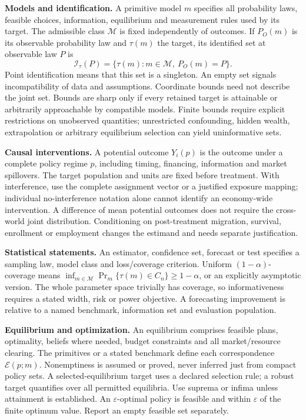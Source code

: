 \documentclass[11pt,a4paper]{article}
\begin{document}
\textbf{Models and identification.} A primitive model \(m\) specifies all probability laws, feasible choices, information, equilibrium and measurement rules used by its target. The admissible class \(\mathcal M\) is fixed independently of outcomes. If \(P_O(m)\) is its observable probability law and \(\tau(m)\) the target, its identified set at observable law \(P\) is
\[
 \mathcal I_\tau(P)=\{\tau(m):m\in\mathcal M,\ P_O(m)=P\}.
\]
Point identification means that this set is a singleton. An empty set signals incompatibility of data and assumptions. Coordinate bounds need not describe the joint set. Bounds are sharp only if every retained target is attainable or arbitrarily approachable by compatible models. Finite bounds require explicit restrictions on unobserved quantities; unrestricted confounding, hidden wealth, extrapolation or arbitrary equilibrium selection can yield uninformative sets.

\textbf{Causal interventions.} A potential outcome \(Y_i(p)\) is the outcome under a complete policy regime \(p\), including timing, financing, information and market spillovers. The target population and units are fixed before treatment. With interference, use the complete assignment vector or a justified exposure mapping; individual no-interference notation alone cannot identify an economy-wide intervention. A difference of mean potential outcomes does not require the cross-world joint distribution. Conditioning on post-treatment migration, survival, enrollment or employment changes the estimand and needs separate justification.

\textbf{Statistical statements.} An estimator, confidence set, forecast or test specifies a sampling law, model class and loss/coverage criterion. Uniform \((1-\alpha)\)-coverage means \(\inf_{m\in\mathcal M}\Pr_m\{\tau(m)\in C_n\}\geq1-\alpha\), or an explicitly asymptotic version. The whole parameter space trivially has coverage, so informativeness requires a stated width, risk or power objective. A forecasting improvement is relative to a named benchmark, information set and evaluation population.

\textbf{Equilibrium and optimization.} An equilibrium comprises feasible plans, optimality, beliefs where needed, budget constraints and all market/resource clearing. The primitives or a stated benchmark define each correspondence \(\mathcal E(p;m)\). Nonemptiness is assumed or proved, never inferred just from compact policy sets. A selected-equilibrium target uses a declared selection rule; a robust target quantifies over all permitted equilibria. Use suprema or infima unless attainment is established. An \(\varepsilon\)-optimal policy is feasible and within \(\varepsilon\) of the finite optimum value. Report an empty feasible set separately.
\end{document}
